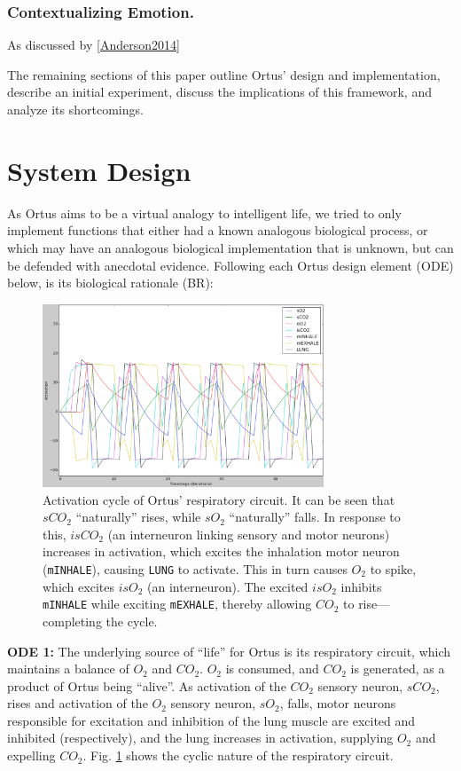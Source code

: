 \documentclass[letterpaper]{article}
\begin{document}
\subsubsection{Contextualizing Emotion.}

As discussed by \ref{Anderson2014}

The remaining sections of this paper outline Ortus' design and implementation, describe an initial experiment, discuss the implications of this framework, and analyze its shortcomings.

\section{System Design}


As Ortus aims to be a virtual analogy to intelligent life, we tried to only implement functions that either had a known analogous biological process, or which may have an analogous biological implementation that is unknown, but can be defended with anecdotal evidence. Following each Ortus design element (ODE) below, is its biological rationale (BR):


\begin{figure}
\begin{center}
\includegraphics[width=3.3in]{images/respiration.png}
\caption{Activation cycle of Ortus' respiratory circuit. It can be seen that $sCO_2$ ``naturally'' rises, while $sO_2$ ``naturally'' falls. In response to this, $isCO_2$ (an interneuron linking sensory and motor neurons) increases in activation, which excites the inhalation motor neuron (\texttt{mINHALE}), causing \texttt{LUNG} to activate. This in turn causes $O_2$ to spike, which excites $isO_2$ (an interneuron). The excited $isO_2$ inhibits \texttt{mINHALE} while exciting \texttt{mEXHALE}, thereby allowing $CO_2$ to rise---completing the cycle.}
\label{respiration}
\end{center}
\end{figure}


\textbf{ODE 1:} The underlying source of ``life'' for Ortus is its respiratory circuit, which maintains a balance of $O_2$ and $CO_2$. $O_2$ is consumed, and $CO_2$ is generated, as a product of Ortus being ``alive''. As activation of the $CO_2$ sensory neuron, $sCO_2$, rises and activation of the $O_2$ sensory neuron, $sO_2$, falls, motor neurons responsible for excitation and inhibition of the lung muscle are excited and inhibited (respectively), and the lung increases in activation, supplying $O_2$ and expelling $CO_2$. Fig. \ref{respiration} shows the cyclic nature of the respiratory circuit.
\end{document}
